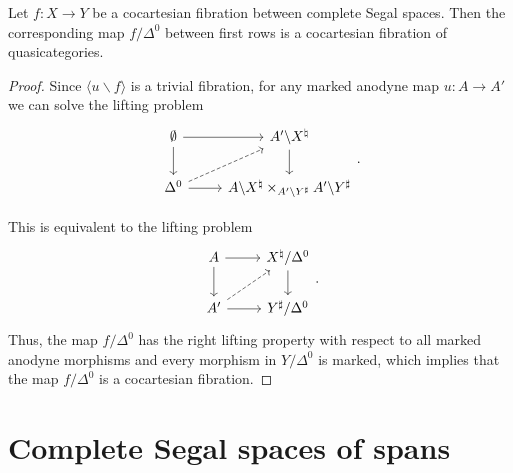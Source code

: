 \documentclass[main.tex]{subfiles}
\begin{document}
\begin{corollary}
  Let $f\colon X \to Y$ be a cocartesian fibration between complete Segal spaces. Then the corresponding map $f / \Delta^{0}$ between first rows is a cocartesian fibration of quasicategories.
\end{corollary}
\begin{proof}
  Since $\langle u \backslash f \rangle$ is a trivial fibration, for any marked anodyne map $u\colon A \to A'$ we can solve the lifting problem
  \begin{equation*}
    \begin{tikzcd}
      \emptyset
      \arrow[r]
      \arrow[d]
      & A' \backslash X^{\natural}
      \arrow[d]
      \\
      \Delta^{0}
      \arrow[r]
      \arrow[ur, dashed]
      & A \backslash X^{\natural} \times_{A' \backslash Y^{\sharp}} A' \backslash Y^{\sharp}
    \end{tikzcd}.
  \end{equation*}

  This is equivalent to the lifting problem
  \begin{equation*}
    \begin{tikzcd}
      A
      \arrow[r]
      \arrow[d]
      & X^{\natural} / \Delta^{0}
      \arrow[d]
      \\
      A'
      \arrow[r]
      \arrow[ur, dashed]
      & Y^{\sharp} / \Delta^{0}
    \end{tikzcd}.
  \end{equation*}
  Thus, the map $f / \Delta^{0}$ has the right lifting property with respect to all marked anodyne morphisms and every morphism in $Y / \Delta^{0}$ is marked, which implies that the map $f / \Delta^{0}$ is a cocartesian fibration.
\end{proof}

\section{Complete Segal spaces of spans}
\label{sec:complete_segal_spaces_of_spans}
\end{document}
